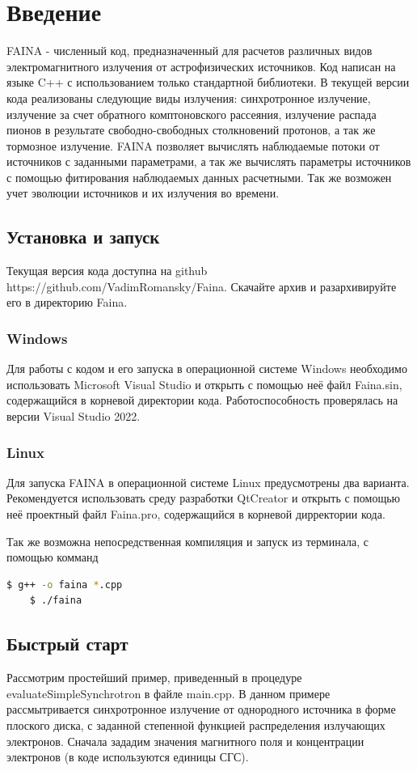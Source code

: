 \chapter*{Введение}		
FAINA - численный код, предназначенный для расчетов различных видов электромагнитного излучения от астрофизических источников. Код написан на языке C++ с использованием только стандартной библиотеки. В текущей версии кода реализованы следующие виды излучения: синхротронное излучение, излучение за счет обратного комптоновского рассеяния, излучение распада пионов в результате свободно-свободных столкновений протонов, а так же тормозное излучение. FAINA позволяет вычислять наблюдаемые потоки от источников с заданными параметрами, а так же вычислять параметры источников с помощью фитирования наблюдаемых данных расчетными. Так же возможен учет эволюции источников и их излучения во времени.

\section*{Установка и запуск}
Текущая версия кода доступна на github https://github.com/VadimRomansky/Faina. Скачайте архив и разархивируйте его в директорию Faina.
\subsection*{Windows}
Для работы с кодом и его запуска в операционной системе Windows необходимо использовать Microsoft Visual Studio и открыть с помощью неё файл Faina.sin, содержащийся в корневой директории кода. Работоспособность проверялась на версии Visual Studio 2022.
\subsection*{Linux}
Для запуска FAINA в операционной системе Linux предусмотрены два варианта. Рекомендуется использовать среду разработки QtCreator и открыть с помощью неё проектный файл Faina.pro, содержащийся в корневой дирректории кода. 

Так же возможна непосредственная компиляция и запуск из терминала, с помощью комманд
\begin{lstlisting}[language=bash]
	$ g++ -o faina *.cpp
	$ ./faina
\end{lstlisting}
\section*{Быстрый старт}
Рассмотрим простейший пример, приведенный в процедуре evaluateSimpleSynchrotron в файле main.cpp. В данном примере рассмытривается синхротронное излучение от однородного источника в форме плоского диска, с заданной степенной функцией распределения излучающих электронов. Сначала зададим значения магнитного поля и концентрации электронов (в коде используются единицы СГС).

